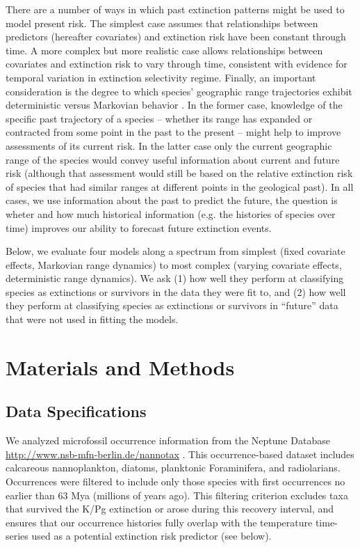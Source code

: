 \documentclass[12pt,letterpaper]{article}
\begin{document}
\begin{refsection}
There are a number of ways in which past extinction patterns might be used to model present risk. The simplest case assumes that relationships between predictors (hereafter covariates) and extinction risk have been constant through time. A more complex but more realistic case allows relationships between covariates and extinction risk to vary through time, consistent with evidence for temporal variation in extinction selectivity regime. Finally, an important consideration is the degree to which species’ geographic range trajectories exhibit deterministic versus Markovian behavior \citep{Liow2007,Kiessling2013,Foote2007b,Pigot2012}. In the former case, knowledge of the specific past trajectory of a species – whether its range has expanded or contracted from some point in the past to the present – might help to improve assessments of its current risk. In the latter case only the current geographic range of the species would convey useful information about current and future risk (although that assessment would still be based on the relative extinction risk of species that had similar ranges at different points in the geological past). In all cases, we use information about the past to predict the future, the question is wheter and how much historical information (e.g. the histories of species over time) improves our ability to forecast future extinction events.

Below, we evaluate four models along a spectrum from simplest (fixed covariate effects, Markovian range dynamics) to most complex (varying covariate effects, deterministic range dynamics). We ask (1) how well they perform at classifying species as extinctions or survivors in the data they were fit to, and (2) how well they perform at classifying species as extinctions or survivors in “future” data that were not used in fitting the models.



\section{Materials and Methods}

\subsection{Data Specifications}

We analyzed microfossil occurrence information from the Neptune Database \url{http://www.nsb-mfn-berlin.de/nannotax} \citep{Lazarus1994,SpencerCervato1999}. This occurrence-based dataset includes calcareous nannoplankton, diatoms, planktonic Foraminifera, and radiolarians. Occurrences were filtered to include only those species with first occurrences no earlier than 63 Mya (millions of years ago). This filtering criterion excludes taxa that survived the K/Pg extinction or arose during this recovery interval, and ensures that our occurrence histories fully overlap with the temperature time-series used as a potential extinction risk predictor (see below). 


\end{refsection}
\end{document}

